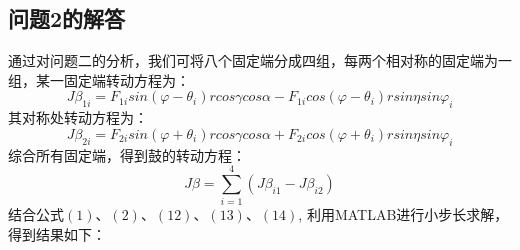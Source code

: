\documentclass{cumcm}
\begin{document}
\subsection{问题2的解答}
通过对问题二的分析，我们可将八个固定端分成四组，每两个相对称的固定端为一组，某一固定端转动方程为：
\begin{equation}
J\beta_{1i}= F_{1i}sin(\varphi-\theta_i)rcos\gamma cos\alpha- F_{1i}cos(\varphi-\theta_i)rsin\eta sin\varphi_i
\end{equation}
其对称处转动方程为：
\begin{equation}
J \beta_{2i}= F_{2i}sin(\varphi+\theta_i)rcos\gamma cos\alpha+F_{2i}cos(\varphi+\theta_i)rsin\eta sin\varphi_i
\end{equation}
综合所有固定端，得到鼓的转动方程：
\begin{equation}
J \beta=\sum_{i=1}^4 (J\beta_{i1}-J\beta_{i2})
\end{equation}
结合公式$(1)$、$(2)$、$(12)$、$(13)$、$(14)$, 利用MATLAB进行小步长求解，得到结果如下：
\end{document}
